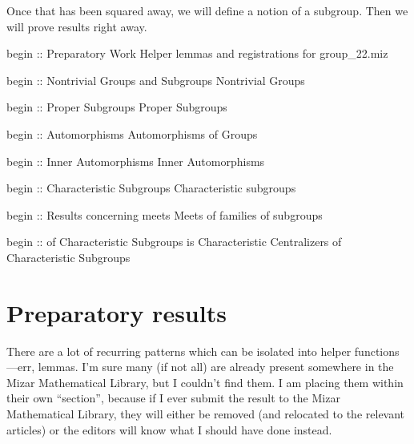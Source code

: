 Once that has been squared away, we will define a notion of a
{\Tt{}\nwendquote} subgroup. Then we will prove results right away.

\nwenddocs{}\endmoddef\nwstartdeflinemarkup{}\nwenddeflinemarkup
begin :: Preparatory Work
\LA{}Helper lemmas and registrations for \code{}group{\_}22.miz\edoc{}~{\nwtagstyle{}}\RA{}

begin :: Nontrivial Groups and Subgroups
\LA{}Nontrivial Groups~{\nwtagstyle{}}\RA{}

begin :: Proper Subgroups
\LA{}Proper Subgroups~{\nwtagstyle{}}\RA{}

begin :: Automorphisms
\LA{}Automorphisms of Groups~{\nwtagstyle{}}\RA{}

begin :: Inner Automorphisms
\LA{}Inner Automorphisms~{\nwtagstyle{}}\RA{}

begin :: Characteristic Subgroups
\LA{}Characteristic subgroups~{\nwtagstyle{}}\RA{}

begin :: Results concerning meets
\LA{}Meets of families of subgroups~{\nwtagstyle{}}\RA{}

begin ::  of Characteristic Subgroups is Characteristic
\LA{}Centralizers of Characteristic Subgroups~{\nwtagstyle{}}\RA{}

\nwendcode{}\nwdocspar

\section{Preparatory results}
There are a lot of recurring patterns which can be isolated into helper
functions---err, lemmas. I'm sure many (if not all) are already present
somewhere in the Mizar Mathematical Library, but I couldn't find them. I
am placing them within their own ``section'', because if I ever submit
the result to the Mizar Mathematical Library, they will either be
removed (and relocated to the relevant articles) or the editors will
know what I should have done instead.


